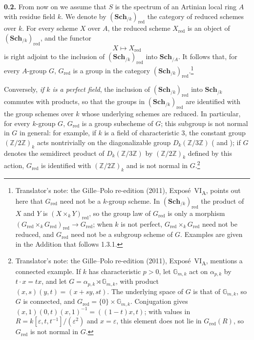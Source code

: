 \medskip
\noindent\textbf{0.2.}
\label{sga3:VIA:0.2}
From now on we assume that \(S\) is the spectrum of an Artinian local ring
\(A\) with residue field \(k\). We denote by
\((\mathbf{Sch}_{/k})_{\mathrm{red}}\) the category of reduced schemes over
\(k\). For every scheme \(X\) over \(A\), the reduced scheme
\(X_{\mathrm{red}}\) is an object of
\((\mathbf{Sch}_{/k})_{\mathrm{red}}\), and the functor
\[
  X\longmapsto X_{\mathrm{red}}
\]
is right adjoint to the inclusion of
\((\mathbf{Sch}_{/k})_{\mathrm{red}}\) into \(\mathbf{Sch}_{/A}\).
It follows that, for every \(A\)-group \(G\), \(G_{\mathrm{red}}\) is a
group in the category
\((\mathbf{Sch}_{/k})_{\mathrm{red}}\).\footnote{Translator's note: the Gille--Polo re-edition (2011),
Exposé~VI\textsubscript{A}, points out here that \(G_{\mathrm{red}}\) need not be a
\(k\)-group scheme. In \((\mathbf{Sch}_{/k})_{\mathrm{red}}\) the product of \(X\) and \(Y\) is
\((X\times_kY)_{\mathrm{red}}\), so the group law of \(G_{\mathrm{red}}\) is only a morphism
\((G_{\mathrm{red}}\times_kG_{\mathrm{red}})_{\mathrm{red}}\to G_{\mathrm{red}}\); when \(k\) is not perfect,
\(G_{\mathrm{red}}\times_kG_{\mathrm{red}}\) need not be reduced, and \(G_{\mathrm{red}}\) need not be a
subgroup scheme of \(G\). Examples are given in the Addition that follows 1.3.1.}

Conversely, \emph{if \(k\) is a perfect field}, the inclusion of
\((\mathbf{Sch}_{/k})_{\mathrm{red}}\) into \(\mathbf{Sch}_{/k}\)
commutes with products, so that the groups in
\((\mathbf{Sch}_{/k})_{\mathrm{red}}\) are identified with the
group schemes over \(k\) whose underlying schemes are reduced. In
particular, for every \(k\)-group \(G\), \(G_{\mathrm{red}}\) is a group subscheme
of \(G\); this subgroup is not normal in \(G\) in general: for example, if \(k\) is a field of characteristic \(3\), the constant
group \((\mathbb Z/2\mathbb Z)_k\) acts nontrivially on the diagonalizable
group \(D_k(\mathbb Z/3\mathbb Z)\) ( and ); if
\(G\) denotes the semidirect product of \(D_k(\mathbb Z/3\mathbb Z)\) by
\((\mathbb Z/2\mathbb Z)_k\) defined by this action,
\(G_{\mathrm{red}}\) is identified with \((\mathbb Z/2\mathbb Z)_k\) and
is not normal in \(G\).\footnote{Translator's note: the Gille--Polo re-edition (2011),
Exposé~VI\textsubscript{A}, mentions a connected example. If \(k\) has characteristic \(p>0\), let
\(\mathbb G_{m,k}\) act on \(\alpha_{p,k}\) by \(t\cdot x=tx\), and let \(G=\alpha_{p,k}\rtimes\mathbb G_{m,k}\),
with product \((x,s)(y,t)=(x+sy,st)\). The underlying space of \(G\) is that of \(\mathbb G_{m,k}\), so
\(G\) is connected, and \(G_{\mathrm{red}}=\{0\}\times\mathbb G_{m,k}\). Conjugation gives
\((x,1)(0,t)(x,1)^{-1}=((1-t)x,t)\); with values in \(R=k[\varepsilon,t,t^{-1}]/(\varepsilon^2)\) and
\(x=\varepsilon\), this element does not lie in \(G_{\mathrm{red}}(R)\), so \(G_{\mathrm{red}}\) is not
normal in \(G\).}

